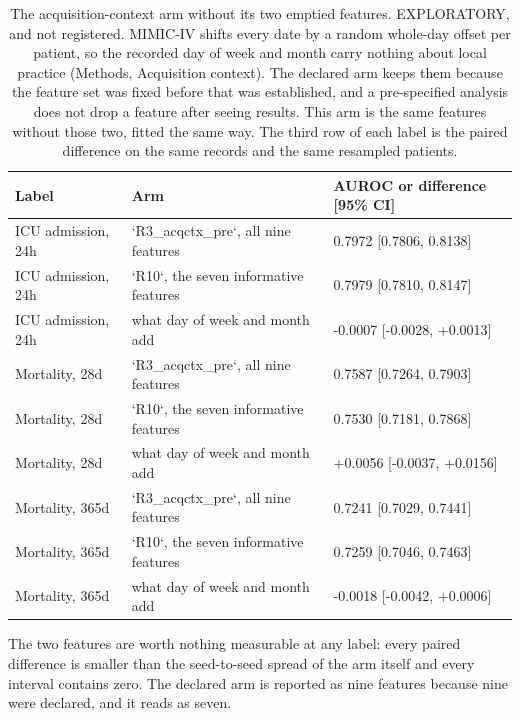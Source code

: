 \begin{table}[t]
\centering
\small
\caption{The acquisition-context arm without its two emptied features. EXPLORATORY, and not registered. MIMIC-IV shifts every date by a random whole-day offset per patient, so the recorded day of week and month carry nothing about local practice (Methods, Acquisition context). The declared arm keeps them because the feature set was fixed before that was established, and a pre-specified analysis does not drop a feature after seeing results. This arm is the same features without those two, fitted the same way. The third row of each label is the paired difference on the same records and the same resampled patients.}
\label{tab:calendar}
\begin{tabular}{lll}
\toprule
Label & Arm & AUROC or difference [95\% CI] \\
\midrule
ICU admission, 24h & `R3\_acqctx\_pre`, all nine features & 0.7972 [0.7806, 0.8138] \\
ICU admission, 24h & `R10`, the seven informative features & 0.7979 [0.7810, 0.8147] \\
ICU admission, 24h & what day of week and month add & -0.0007 [-0.0028, +0.0013] \\
Mortality, 28d & `R3\_acqctx\_pre`, all nine features & 0.7587 [0.7264, 0.7903] \\
Mortality, 28d & `R10`, the seven informative features & 0.7530 [0.7181, 0.7868] \\
Mortality, 28d & what day of week and month add & +0.0056 [-0.0037, +0.0156] \\
Mortality, 365d & `R3\_acqctx\_pre`, all nine features & 0.7241 [0.7029, 0.7441] \\
Mortality, 365d & `R10`, the seven informative features & 0.7259 [0.7046, 0.7463] \\
Mortality, 365d & what day of week and month add & -0.0018 [-0.0042, +0.0006] \\
\bottomrule
\end{tabular}
\par\footnotesize The two features are worth nothing measurable at any label: every paired difference is smaller than the seed-to-seed spread of the arm itself and every interval contains zero. The declared arm is reported as nine features because nine were declared, and it reads as seven.
\end{table}

